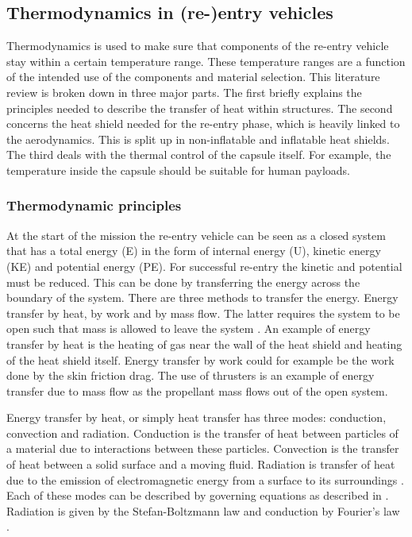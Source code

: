 \subsection{Thermodynamics in (re-)entry vehicles}\label{sec:thermo}
Thermodynamics is used to make sure that components of the re-entry vehicle stay within a certain temperature range. These temperature ranges are a function of the intended use of the components and material selection. This literature review is broken down in three major parts. The first briefly explains the principles needed to describe the transfer of heat within structures. The second concerns the heat shield needed for the re-entry phase, which is heavily linked to the aerodynamics. This is split up in non-inflatable and inflatable heat shields. The third deals with the thermal control of the capsule itself. For example, the temperature inside the capsule should be suitable for human payloads.

\subsubsection{Thermodynamic principles}
At the start of the mission the re-entry vehicle can be seen as a closed system that has a total energy (E) in the form of internal energy (U), kinetic energy (KE) and potential energy (PE). For successful re-entry the kinetic and potential must be reduced. This can be done by transferring the energy across the boundary of the system. There are three methods to transfer the energy. Energy transfer by heat, by work and by mass flow. The latter requires the system to be open such that mass is allowed to leave the system \cite{Cengel2010}. An example of energy transfer by heat is the heating of gas near the wall of the heat shield and heating of the heat shield itself. Energy transfer by work could for example be the work done by the skin friction drag. The use of thrusters is an example of energy transfer due to mass flow as the propellant mass flows out of the open system. 

Energy transfer by heat, or simply heat transfer has three modes: conduction, convection and radiation. Conduction is the transfer of heat between particles of a material due to interactions between these particles. Convection is the transfer of heat between a solid surface and a moving fluid. Radiation is transfer of heat due to the emission of electromagnetic energy from a surface to its surroundings \cite{Cengel2010, Karam1998}. Each of these modes can be described by governing equations as described in \cite{Holman2002}. Radiation is given by the Stefan-Boltzmann law and conduction by Fourier's law \cite{Cengel2010, Holman2002}.


